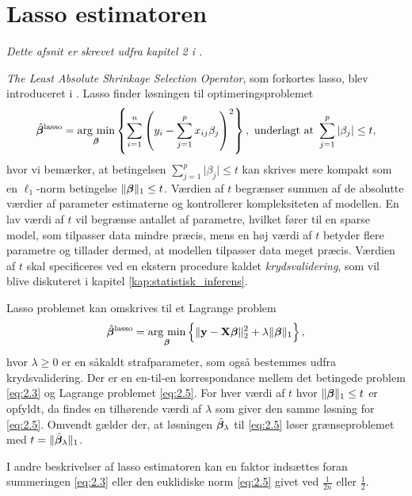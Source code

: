 \section{Lasso estimatoren} \label{sec:lasso_estimatoren}
\textit{Dette afsnit er skrevet udfra kapitel 2 i \citep{hastie}.}

\textit{The Least Absolute Shrinkage Selection Operator}, som forkortes lasso, blev introduceret i \citep{lasso}. 
Lasso finder løsningen til optimeringsproblemet
\begin{align}
\hat{\tbeta}^\text{lasso} = \argmin_{\tbeta} \cbr{\sum_{i=1}^n \del{y_i - \sum_{j=1}^p x_{ij} \beta_j}^2}, \ \text{underlagt at } \sum_{j=1}^p \vert \beta_j \vert \leq t, \label{eq:2.3}
\end{align} 
hvor vi bemærker, at betingelsen $\sum_{j=1}^p \vert \beta_j \vert \leq t$ kan skrives mere kompakt som en \(\ell_1\)-norm betingelse $\Vert \boldsymbol{\beta} \Vert_1 \leq t$.
Værdien af \(t\) begrænser summen af de absolutte værdier af parameter estimaterne og kontrollerer kompleksiteten af modellen. 
En lav værdi af \(t\) vil begrænse antallet af parametre, hvilket fører til en sparse model, som tilpasser data mindre præcis, mens en høj værdi af \(t\) betyder flere parametre og tillader dermed, at modellen tilpasser data meget præcis.
Værdien af \(t\) skal specificeres ved en ekstern procedure kaldet \textit{krydsvalidering}, som vil blive diskuteret i kapitel \ref{kap:statistisk_inferens}.

Lasso problemet kan omskrives til et Lagrange problem
\begin{align}
\hat{\tbeta}^\text{lasso} = \argmin_{\tbeta} \cbr{ \Vert \y - \X \tbeta \Vert_2^2 + \lambda \Vert \tbeta \Vert_1}, \label{eq:2.5}
\end{align}
hvor $\lambda \geq 0$ er en såkaldt strafparameter, som også bestemmes udfra krydsvalidering. 
Der er en en-til-en korrespondance mellem det betingede problem \eqref{eq:2.3} og Lagrange problemet \eqref{eq:2.5}. 
For hver værdi af \(t\) hvor \(\Vert \boldsymbol{\beta} \Vert_1 \leq t\) er opfyldt, da findes en tilhørende værdi af $\lambda$ som giver den samme løsning for \eqref{eq:2.5}.
Omvendt gælder der, at løsningen $\hat{\boldsymbol{\beta}}_\lambda$ til \eqref{eq:2.5} løser grænseproblemet med $t=\Vert \hat{\boldsymbol{\beta}}_\lambda \Vert_1$.

I andre beskrivelser af lasso estimatoren kan en faktor indsættes foran summeringen \eqref{eq:2.3} eller den euklidiske norm \eqref{eq:2.5} givet ved \(\frac{1}{2n}\) eller \(\frac{1}{2}\).

